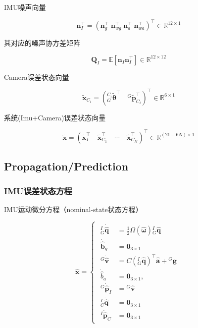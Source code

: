\documentclass[12pt,a4paper]{article}
\begin{document}
IMU噪声向量

\begin{equation*}
\mathbf{n}_I^\top = 
\left(\mathbf{n}_g^\top \; \mathbf{n}_{wg}^\top \; \mathbf{n}_a^\top \; \mathbf{n}_{wa}^\top\right)^\top
\in \mathbb{R}^{12 \times 1}
\end{equation*}

其对应的噪声协方差矩阵

\begin{equation*}
\mathbf{Q}_I = \mathbb{E}\left[\mathbf{n}_I^{}\mathbf{n}_I^\top\right]
\in \mathbb{R}^{12 \times 12}
\end{equation*}

Camera误差状态向量

\begin{equation*}
\tilde{\mathbf{x}}_{C_i} = 
\left(
{}^{C_i}_G\tilde{\boldsymbol{\theta}}^\top \quad
{}^G\tilde{\mathbf{p}}_{C_i}^\top
\right)^\top
\in \mathbb{R}^{6 \times 1}
\end{equation*}

系统(Imu+Camera)误差状态向量

\begin{equation*}
\tilde{\mathbf{x}} = 
\left(
\tilde{\mathbf{x}}_I^\top \quad
\tilde{\mathbf{x}}_{C_1}^\top \quad
\cdots \quad 
\tilde{\mathbf{x}}_{C_N}^\top
\right)^\top
\in \mathbb{R}^{(21+6N) \times 1}
\end{equation*}


\subsection{Propagation/Prediction}

\subsubsection{IMU误差状态方程}

IMU运动微分方程（nominal-state状态方程）

\begin{equation}
\label{equ:imu_diff_func_nominal_state}
\hat{\mathbf{x}} = 
\begin{cases}
\begin{aligned}
{}^I_G\dot{\hat{\mathbf{q}}} &= \frac{1}{2}\Omega(\hat{\boldsymbol{\omega}}) {}^I_G\hat{\mathbf{q}} \\
\dot{\hat{\mathbf{b}}}_g &= \mathbf{0}_{3\times 1} \\
{}^G\dot{\hat{\mathbf{v}}} &= C\left({}^I_G\hat{\mathbf{q}}\right)^\top \hat{\mathbf{a}} + {}^G\mathbf{g} \\
\dot{\hat{b}}_a &= \mathbf{0}_{3\times 1}, \\
{}^G\dot{\hat{\mathbf{p}}}_I &= {}^G\hat{\mathbf{v}} \\
{}^I_C\dot{\hat{\mathbf{q}}} &= \mathbf{0}_{3\times 1} \\
{}^I\dot{\hat{\mathbf{p}}}_C &= \mathbf{0}_{3\times 1}
\end{aligned}
\end{cases}
\end{equation}
\end{document}
